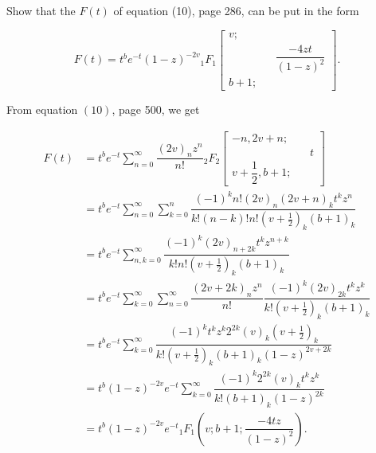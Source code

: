 \begin{problem}\label{problem13chapter18}
Show that the $F(t)$ of equation (10), page 286, can be put in the form

$$F(t) = t^b e^{-t} (1-z)^{-2v} {}_1F_1 \left[ \begin{array}{rlr}
v; & & \\
& & \dfrac{-4zt}{(1-z)^2} \\
b+1; & & 
\end{array} \right].$$
\end{problem}
\begin{solution}
From equation $(10)$, page 500, we get

$$\begin{array}{ll}
F(t) &= t^b e^{-t} \displaystyle\sum_{n=0}^{\infty} \dfrac{(2v)_n z^n}{n!} {}_2F_2 \left[ \begin{array}{rlr} 
-n, 2v+n; & &\\
& & t \\
v + \dfrac{1}{2}, b+1; & & 
\end{array} \right] \\
&= t^b e^{-t} \displaystyle\sum_{n=0}^{\infty} \displaystyle\sum_{k=0}^n \dfrac{(-1)^k n! (2v)_n(2v+n)_k t^k z^n}{k! (n-k)! n! (v + \frac{1}{2})_k (b+1)_k} \\
&= t^b e^{-t} \displaystyle\sum_{n,k=0}^{\infty} \dfrac{(-1)^k (2v)_{n+2k} t^k z^{n+k}}{k! n! (v + \frac{1}{2})_k (b+1)_k} \\
&= t^b e^{-t} \displaystyle\sum_{k=0}^{\infty} \displaystyle\sum_{n=0}^{\infty} \dfrac{(2v+2k)_n z^n}{n!} \dfrac{(-1)^k (2v)_{2k} t^k z^k}{k! (v+\frac{1}{2})_k (b+1)_k} \\
&= t^b e^{-t} \displaystyle\sum_{k=0}^{\infty} \dfrac{(-1)^k t^k z^k 2^{2k} (v)_k (v + \frac{1}{2})_k}{k! (v+\frac{1}{2})_k (b+1)_k (1-z)^{2v+2k}} \\
&= t^b (1-z)^{-2v} e^{-t} \displaystyle\sum_{k=0}^{\infty} \dfrac{(-1)^k 2^{2k} (v)_k t^k z^k}{k! (b+1)_k (1-z)^{2k}} \\
&= t^b (1-z)^{-2v} e^{-t} {}_1F_1 \left( v; b+1; \dfrac{-4tz}{(1-z)^2} \right).
\end{array}$$
\end{solution}